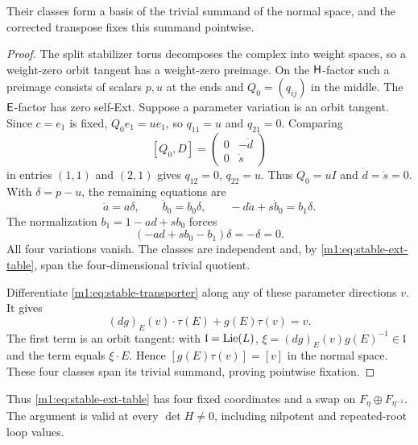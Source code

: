 \begin{lemma}\label{m1:lem:stable-parameter-basis}
Their classes form a basis of the trivial summand of the normal space,
and the corrected transpose fixes this summand pointwise.
\end{lemma}
\begin{proof}
The split stabilizer torus decomposes the complex into weight spaces,
so a weight-zero orbit tangent has a weight-zero preimage. On the
$\mathsf H$-factor such a preimage consists of scalars $p,u$ at the ends
and $Q_0=(q_{ij})$ in the middle. The $\mathsf E$-factor has zero self-Ext.
Suppose a parameter variation is an orbit tangent. Since $c=e_1$ is
fixed, $Q_0e_1=ue_1$, so $q_{11}=u$ and $q_{21}=0$. Comparing
\[
 [Q_0,D]=\begin{pmatrix}0&-\dot d\\0&\dot s\end{pmatrix}
\]
in entries $(1,1)$ and $(2,1)$ gives $q_{12}=0$, $q_{22}=u$. Thus
$Q_0=uI$ and $\dot d=\dot s=0$. With $\delta=p-u$, the remaining
equations are
\[
 \dot a=a\delta,\qquad\dot b_0=b_0\delta,\qquad
 -d\dot a+s\dot b_0=b_1\delta.
\]
The normalization $b_1=1-ad+sb_0$ forces
\begin{equation}\label{m1:eq:stable-independence-identity}
 (-ad+sb_0-b_1)\delta=-\delta=0.
\end{equation}
All four variations vanish. The classes are independent and, by
\eqref{m1:eq:stable-ext-table}, span the four-dimensional trivial quotient.

Differentiate \eqref{m1:eq:stable-transporter} along any of these parameter
directions $v$. It gives
\[
 (dg)_E(v)\cdot\tau(E)+g(E)\tau(v)=v.
\]
The first term is an orbit tangent: with $\mathfrak l=\operatorname{Lie}(L)$,
$\xi=(dg)_E(v)g(E)^{-1}\in\mathfrak l$ and the term equals $\xi\cdot E$.
Hence $[g(E)\tau(v)]=[v]$ in the normal space. These four classes span
its trivial summand, proving pointwise fixation.
\end{proof}
Thus \eqref{m1:eq:stable-ext-table} has four fixed coordinates and a swap
on $F_\eta\oplus F_{\eta^{-1}}$. The argument is valid at every
$\det H\neq0$, including nilpotent and repeated-root loop values.


